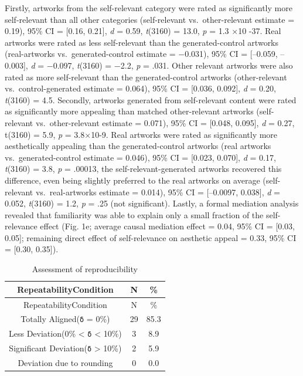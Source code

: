 \documentclass[
  man]{apa6}
\begin{document}
Firstly, artworks from the self-relevant category were rated as significantly more self-relevant than all other categories (self-relevant vs.~other-relevant estimate = 0.19), 95\% CI = {[}0.16, 0.21{]}, \emph{d} = 0.59, \emph{t}(3160) = 13.0, \emph{p} = 1.3 ×10 -37. Real artworks were rated as less self-relevant than the generated-control artworks (real-artworks vs.~generated-control estimate = −0.031), 95\% CI = {[}--0.059, --0.003{]}, \emph{d} = −0.097, \emph{t}(3160) = −2.2, \emph{p} = .031. Other relevant artworks were also rated as more self-relevant than the generated-control artworks (other-relevant vs.~control-generated estimate = 0.064), 95\% CI = {[}0.036, 0.092{]}, \emph{d} = 0.20, \emph{t}(3160) = 4.5. Secondly, artworks generated from self-relevant content were rated as significantly more appealing than matched other-relevant artworks (self-relevant vs.~other-relevant estimate = 0.071), 95\% CI = {[}0.048, 0.095{]}, \emph{d} = 0.27, t(3160) = 5.9, \emph{p} = 3.8×10-9. Real artworks were rated as significantly more aesthetically appealing than the generated-control artworks (real artworks vs.~generated-control estimate = 0.046), 95\% CI = {[}0.023, 0.070{]}, \emph{d} = 0.17, \emph{t}(3160) = 3.8, \emph{p} = .00013, the self-relevant-generated artworks recovered this difference, even being slightly preferred to the real artworks on average (self-relevant vs.~real-artworks estimate = 0.014), 95\% CI = {[}--0.0097, 0.038{]}, \emph{d} = 0.052, \emph{t}(3160) = 1.2, \emph{p} = .25 (not significant). Lastly, a formal mediation analysis revealed that familiarity was able to explain only a small fraction of the self-relevance effect (Fig. 1e; average causal mediation effect = 0.04, 95\% CI = {[}0.03, 0.05{]}; remaining direct effect of self-relevance on aesthetic appeal = 0.33, 95\% CI = {[}0.30, 0.35{]}).

\begin{longtable}[]{@{}ccc@{}}
\caption{\label{tab:unnamed-chunk-5}Assessment of reproducibility}\tabularnewline
\toprule\noalign{}
RepeatabilityCondition & N & \% \\
\midrule\noalign{}
\endfirsthead
\toprule\noalign{}
RepeatabilityCondition & N & \% \\
\midrule\noalign{}
\endhead
\bottomrule\noalign{}
\endlastfoot
Totally Aligned(\texttt{δ} = 0\%) & 29 & 85.3 \\
Less Deviation(0\% \textless{} \texttt{δ} \textless{} 10\%) & 3 & 8.9 \\
Significant Deviation(\texttt{δ} \textgreater{} 10\%) & 2 & 5.9 \\
Deviation due to rounding & 0 & 0.0 \\
\end{longtable}
\end{document}
